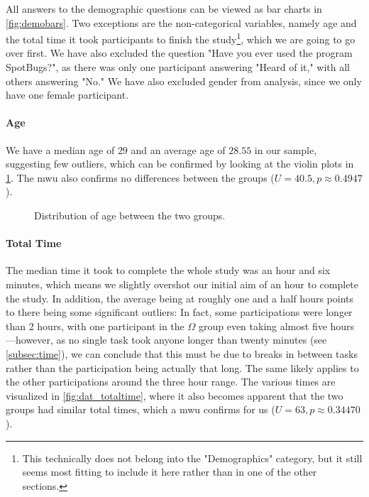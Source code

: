 \documentclass[../thesis]{subfiles}
\begin{document}
All answers to the demographic questions can be viewed as bar charts in \cref{fig:demobars}.
Two exceptions are the non-categorical variables, namely age and the total time it took participants to finish the study\footnote{This technically does not belong into the "Demographics" category, but it still seems most fitting to include it here rather than in one of the other sections.}, which we are going to go over first.
We have also excluded the question "Have you ever used the program SpotBugs?", as there was only one participant answering "Heard of it," with all others answering "No."
We have also excluded gender from analysis, since we only have one female participant.


\paragraph{Age}
We have a median age of $29$ and an average age of $28.55$ in our sample, suggesting few outliers, which can be confirmed by looking at the violin plots in \cref{fig:dat_age}.
The \gls{mwu} also confirms no differences between the groups ($U = 40.5, p \approx 0.4947$).

\begin{figure}
	\begin{center}
	\end{center}
	\caption{Distribution of age between the two groups.}\label{fig:dat_age}
\end{figure}

\paragraph{Total Time}
The median time it took to complete the whole study was an hour and six minutes, which means we slightly overshot our initial aim of an hour to complete the study.
In addition, the average being at roughly one and a half hours points to there being some significant outliers:
In fact, some participations were longer than 2 hours, with one participant in the $\Omega$ group even taking almost five hours---however, as no single task took anyone longer than twenty minutes (see \cref{subsec:time}), we can conclude that this must be due to breaks in between tasks rather than the participation being actually that long.
The same likely applies to the other participations around the three hour range.
The various times are visualized in \cref{fig:dat_totaltime}, where it also becomes apparent that the two groups had similar total times, which a \gls{mwu} confirms for us ($U = 63, p \approx 0.34470$).
\end{document}
